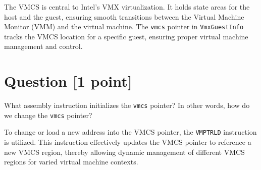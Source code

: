 \documentclass[11pt]{article}
\begin{document}
\begin{solution}
The VMCS is central to Intel's VMX virtualization. It holds state areas for the host and the guest, ensuring smooth transitions between the Virtual Machine Monitor (VMM) and the virtual machine. The \texttt{vmcs} pointer in \texttt{VmxGuestInfo} tracks the VMCS location for a specific guest, ensuring proper virtual machine management and control.

\end{solution}


\section{Question [1 point]}

What assembly instruction initializes the \texttt{vmcs} pointer? In other words, how do we change the \texttt{vmcs} pointer?

\begin{solution}

To change or load a new address into the VMCS pointer, the \texttt{VMPTRLD} instruction is utilized. This instruction effectively updates the VMCS pointer to reference a new VMCS region, thereby allowing dynamic management of different VMCS regions for varied virtual machine contexts.

\end{solution}
\end{document}
